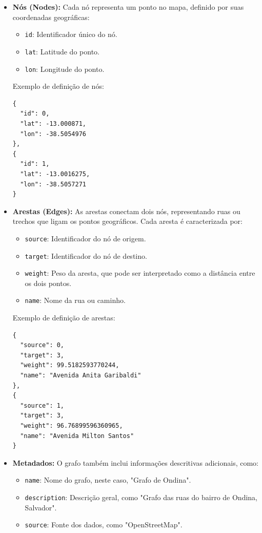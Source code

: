 \documentclass[12pt, a4paper]{report}
\begin{document}
\begin{itemize}
    \item \textbf{Nós (Nodes):}
    Cada nó representa um ponto no mapa, definido por suas coordenadas geográficas:
    \begin{itemize}
        \item \texttt{id}: Identificador único do nó.
        \item \texttt{lat}: Latitude do ponto.
        \item \texttt{lon}: Longitude do ponto.
    \end{itemize}
    Exemplo de definição de nós:
\begin{verbatim}
{
  "id": 0,
  "lat": -13.000871,
  "lon": -38.5054976
},
{
  "id": 1,
  "lat": -13.0016275,
  "lon": -38.5057271
}
\end{verbatim}

    \item \textbf{Arestas (Edges):}
    As arestas conectam dois nós, representando ruas ou trechos que ligam os pontos geográficos. Cada aresta é caracterizada por:
    \begin{itemize}
        \item \texttt{source}: Identificador do nó de origem.
        \item \texttt{target}: Identificador do nó de destino.
        \item \texttt{weight}: Peso da aresta, que pode ser interpretado como a distância entre os dois pontos.
        \item \texttt{name}: Nome da rua ou caminho.
    \end{itemize}
    Exemplo de definição de arestas:
\begin{verbatim}
{
  "source": 0,
  "target": 3,
  "weight": 99.5182593770244,
  "name": "Avenida Anita Garibaldi"
},
{
  "source": 1,
  "target": 3,
  "weight": 96.76899596360965,
  "name": "Avenida Milton Santos"
}
\end{verbatim}
    \item \textbf{Metadados:}
    O grafo também inclui informações descritivas adicionais, como:
    \begin{itemize}
        \item \texttt{name}: Nome do grafo, neste caso, "Grafo de Ondina".
        \item \texttt{description}: Descrição geral, como "Grafo das ruas do bairro de Ondina, Salvador".
        \item \texttt{source}: Fonte dos dados, como "OpenStreetMap".
    \end{itemize}
\end{itemize}
\end{document}
